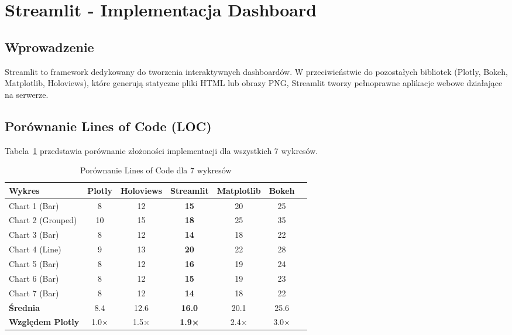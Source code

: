 \documentclass[a4paper,11pt]{article}
\begin{document}
\section{Streamlit - Implementacja Dashboard}

\subsection{Wprowadzenie}

Streamlit to framework dedykowany do tworzenia interaktywnych dashboardów.
W przeciwieństwie do pozostałych bibliotek (Plotly, Bokeh, Matplotlib, Holoviews),
które generują statyczne pliki HTML lub obrazy PNG, Streamlit tworzy pełnoprawne
aplikacje webowe działające na serwerze.

\subsection{Porównanie Lines of Code (LOC)}

Tabela~\ref{tab:loc_all_charts} przedstawia porównanie złożoności implementacji
dla wszystkich 7 wykresów.

\begin{table}[h]
\centering
\caption{Porównanie Lines of Code dla 7 wykresów}
\label{tab:loc_all_charts}
\begin{tabular}{@{}lcccccc@{}}
\toprule
\textbf{Wykres} & \textbf{Plotly} & \textbf{Holoviews} & \textbf{Streamlit} & \textbf{Matplotlib} & \textbf{Bokeh} \\
\midrule
Chart 1 (Bar)          & 8  & 12 & \textbf{15} & 20 & 25 \\
Chart 2 (Grouped)      & 10 & 15 & \textbf{18} & 25 & 35 \\
Chart 3 (Bar)          & 8  & 12 & \textbf{14} & 18 & 22 \\
Chart 4 (Line)         & 9  & 13 & \textbf{20} & 22 & 28 \\
Chart 5 (Bar)          & 8  & 12 & \textbf{16} & 19 & 24 \\
Chart 6 (Bar)          & 8  & 12 & \textbf{15} & 19 & 23 \\
Chart 7 (Bar)          & 8  & 12 & \textbf{14} & 18 & 22 \\
\midrule
\textbf{Średnia}       & 8.4 & 12.6 & \textbf{16.0} & 20.1 & 25.6 \\
\textbf{Względem Plotly} & 1.0× & 1.5× & \textbf{1.9×} & 2.4× & 3.0× \\
\bottomrule
\end{tabular}
\end{table}
\end{document}
